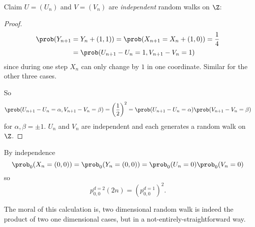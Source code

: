 \documentclass[a4paper]{article}
\begin{document}
Claim \(U = (U_n)\) and \(V = (V_n)\) are \emph{independent} random walks on \(\Z\):

\begin{proof}
  \begin{align*}
    \prob(Y_{n+1} &= Y_n+ (1,1)) = \prob(X_{n+1} = X_n + (1,0)) = \frac{1}{4} \\
                  &= \prob(U_{n+1} - U_n = 1, V_{n+1} - V_n = 1)
  \end{align*}
  since during one step \(X_n\) can only change by \(1\) in one coordinate. Similar for the other three cases.

  So
  \[
    \prob(U_{n+1} - U_n = \alpha, V_{n+1} - V_n = \beta) = \left( \frac{1}{2} \right)^2 = \prob(U_{n+1} - U_n = \alpha) \prob(V_{n+1} - V_n = \beta)
  \]
  for \(\alpha, \beta = \pm 1\). \(U_n\) and \(V_n\) are independent and each generates a random walk on \(\Z\).
\end{proof}

By independence
  \[
    \prob_0(X_n = (0,0)) = \prob_0(Y_n = (0,0)) = \prob_0(U_n = 0) \prob_0(V_n = 0)
  \]
  so
  \[
    p_{0,0}^{d=2}(2n) = \left( p_{0,0}^{d=1} \right)^2.
  \]

  The moral of this calculation is, two dimensional random walk is indeed the product of two one dimensional cases, but in a not-entirely-straightforward way.

\iffalse
\appendix

\section{Resources}


Reading list: Probability, an introduction Grimmet, Welsh, 2nd edition, Chapter 12

\fi
\end{document}
